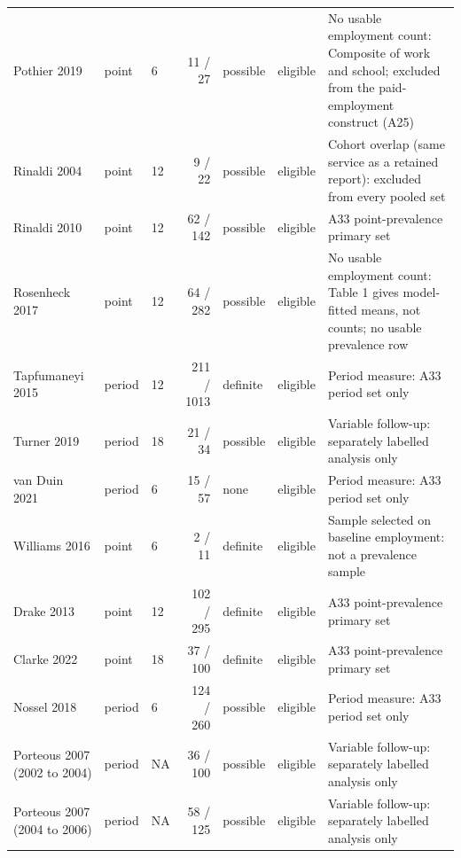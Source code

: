 \begin{tabular}{lllrllp{5.5cm}}
Pothier 2019 & point & 6 & 11 / 27 & possible & eligible & No usable employment count: Composite of work and school; excluded from the paid-employment construct (A25)\\
Rinaldi 2004 & point & 12 & 9 / 22 & possible & eligible & Cohort overlap (same service as a retained report): excluded from every pooled set\\
Rinaldi 2010 & point & 12 & 62 / 142 & possible & eligible & A33 point-prevalence primary set\\
Rosenheck 2017 & point & 12 & 64 / 282 & possible & eligible & No usable employment count: Table 1 gives model-fitted means, not counts; no usable prevalence row\\
Tapfumaneyi 2015 & period & 12 & 211 / 1013 & definite & eligible & Period measure: A33 period set only\\
Turner 2019 & period & 18 & 21 / 34 & possible & eligible & Variable follow-up: separately labelled analysis only\\
van Duin 2021 & period & 6 & 15 / 57 & none & eligible & Period measure: A33 period set only\\
Williams 2016 & point & 6 & 2 / 11 & definite & eligible & Sample selected on baseline employment: not a prevalence sample\\
Drake 2013 & point & 12 & 102 / 295 & definite & eligible & A33 point-prevalence primary set\\
Clarke 2022 & point & 18 & 37 / 100 & definite & eligible & A33 point-prevalence primary set\\
Nossel 2018 & period & 6 & 124 / 260 & possible & eligible & Period measure: A33 period set only\\
Porteous 2007 (2002 to 2004) & period & NA & 36 / 100 & possible & eligible & Variable follow-up: separately labelled analysis only\\
Porteous 2007 (2004 to 2006) & period & NA & 58 / 125 & possible & eligible & Variable follow-up: separately labelled analysis only\\
\bottomrule
\end{tabular}
